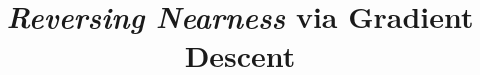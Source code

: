 \documentclass[12pt, a4paper, titlepage]{article}
\title{\emph{Reversing Nearness} via Gradient Descent}
\date{
\parbox{\linewidth}{\centering%
  \today\endgraf\bigskip
\textbf{Mathematics}\\\emph{Is gradient descent a viable approach for Reversing Nearness?}\\Word Count: 3934}}
\begin{document}
\maketitle
\begin{onehalfspace}
\tableofcontents
\end{onehalfspace}





%

%

\printbibliography
\appendix

\end{document}
